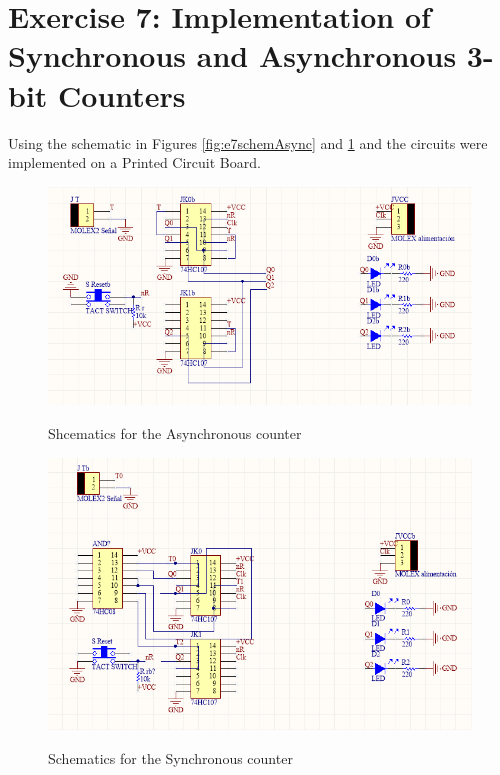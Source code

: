 
%
    \section{\color{olive}Exercise 7: Implementation of Synchronous and Asynchronous 3-bit Counters}
    Using the schematic in Figures \ref{fig:e7schemAsync} and \ref{fig:e7schemSync} and  the circuits were implemented on a Printed Circuit Board.

    \begin{figure}[h!]
        \begin{center}
            \includegraphics[width=0.6\linewidth]{../Exercise7/latex/images/aaschem7async.png}
            \caption{Shcematics for the Asynchronous counter}
            \label{fig:e7schemAsync}
            \includegraphics[width=0.6\linewidth]{../Exercise7/latex/images/aaschem7sync.png}
            \caption{\color{cyan}Schematics for the Synchronous counter}
            \label{fig:e7schemSync}
        \end{center}
    \end{figure}

